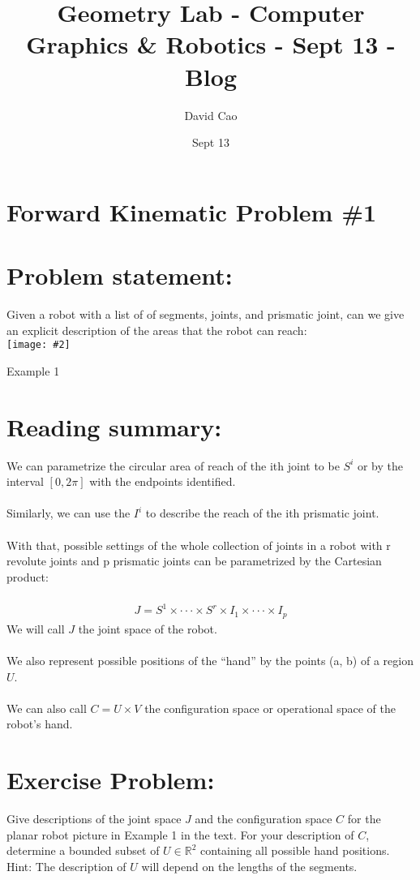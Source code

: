 \documentclass[11pt]{article}
\title{Geometry Lab - Computer Graphics \& Robotics - Sept 13 - Blog}
\author{David Cao}
\date{Sept 13}
\newcommand{\image}[2]{\texttt{[image: \#2]}}
\newcommand{\myalign}[1]{\begin{align*}#1\end{align*}}
\begin{document}
\maketitle

\section*{Forward Kinematic Problem \#1}

\section{Problem statement:}
Given a robot with a list of of segments, joints, and prismatic joint, can we give an explicit description of the areas that the robot can reach:
\vspace{3em} \\
\image{0.75}{img1}\\
\begin{center}
  Example 1
\end{center}

\section{Reading summary:}

We can parametrize the circular area of reach of the ith joint to be $S^i$ or by the interval $[0, 2\pi]$ with the endpoints identified.  \\
\\
Similarly, we can use the $I^i$ to describe the reach of the ith prismatic joint.  \\
\\
With that, possible settings of the whole collection of joints in a robot with r revolute joints and p prismatic joints can be parametrized by the Cartesian product:  \\
\\
\myalign{
  J = S^1 \times \cdot\cdot\cdot \times S^r \times I_1 \times \cdot\cdot\cdot \times I_p
}
We will call $J$ the joint space of the robot.\\
\\
We also represent possible positions of the “hand” by the points (a, b) of a region $U$. \\
\\
We can also call $C = U \times V$  the configuration space or operational space of the robot's
hand. \\
\section{Exercise Problem:}
Give descriptions of the joint space $J$ and the configuration space $C$ for the planar robot picture in Example 1 in the text. For your description of $C$, determine a bounded subset of $U \in \mathbb{R}^2$ containing all possible hand positions. Hint: The description of $U$ will depend on the lengths of the segments. \\
\end{document}
